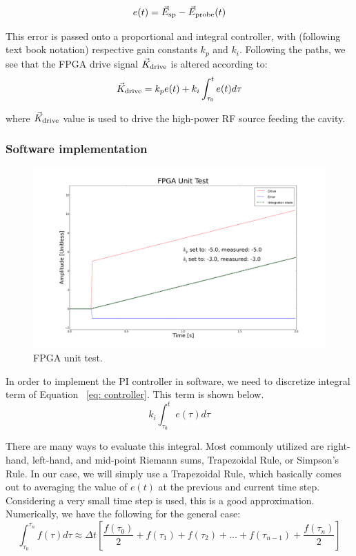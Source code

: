 \documentclass[a4paper,12pt]{article}
\newcommand{\be}{\begin{equation}}
\newcommand{\ee}{\end{equation}}
\begin{document}
\be
e(t) = \vec{E}_{\rm sp} - \vec{E}_{\rm probe}(t)
\ee

\noindent This error is passed onto a proportional and integral controller, with (following text book notation) respective gain constants $k_{p}$ and $k_{i}$. Following the paths, we see that the FPGA drive signal $\vec{K}_{\rm drive}$ is altered according to: 
\be \label{eq: controller}
\vec{K}_{\rm drive} = k_{p} e(t) + k_{i} \int_{\tau_{0}}^{t} e(t) d\tau
\ee

\noindent where $\vec{K}_{\rm drive}$ value is used to drive the high-power RF source feeding the cavity.

\subsubsection{Software implementation}

\begin{figure}
\centering
\includegraphics[scale=0.25]{../figures/fpga_unit_test.png}
\caption{FPGA unit test.}
\label{fig:fpga_unit_test}
\end{figure}

In order to implement the PI controller in software, we need to discretize integral term of Equation ~\ref{eq: controller}. This term is shown below. 
\be
k_{i} \int_{\tau_{0}}^{t} e(\tau)d\tau
\ee

There are many ways to evaluate this integral. Most commonly utilized are right-hand, left-hand, and mid-point Riemann sums, Trapezoidal Rule, or Simpson's Rule. In our case, we will simply use a Trapezoidal Rule, which basically comes out to averaging the value of $e(t)$ at the previous and current time step. Considering a very small time step is used, this is a good approximation. Numerically, we have the following for the general case:
\be
\int_{\tau_{0}}^{\tau_{n}} f(\tau) d\tau \approx \Delta t
		    \left[\frac{f(\tau_{0})}{2} + f(\tau_{1}) + f(\tau_{2}) + ...
		      + f(\tau_{n-1}) + \frac{f(\tau_{n})}{2}\right]
\ee
\end{document}
